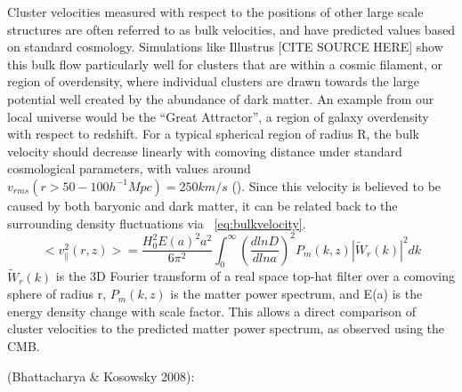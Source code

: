 \documentclass[manuscript]{aastex}
\begin{document}
Cluster velocities measured with respect to the positions of other large scale structures are often referred to as bulk velocities, and have predicted values based on standard cosmology.  Simulations like Illustrus [CITE SOURCE HERE] show this bulk flow particularly well for clusters that are within a cosmic filament, or region of overdensity, where individual clusters are drawn towards the large potential well created by the abundance of dark matter. An example from our local universe would be the ``Great Attractor'', a region of galaxy overdensity with respect to redshift. For a typical spherical region of radius R, the bulk velocity should decrease linearly with comoving distance under standard cosmological parameters, with values around \(v_{rms}(r > 50-100  h^{-1} Mpc) = 250 km/s\) (\cite{Mak2011}). Since this velocity is believed to be caused by both baryonic and dark matter, it can be related back to the surrounding density fluctuations via ~\ref{eq:bulkvelocity}. 
\begin{equation}\label{eq:bulkvelocity}
 <v^{2}_{\parallel}(r,z)> = \frac{H_{0}^{2}E(a)^{2}a^{2}}{6\pi^{2}} \int_{0}^{\infty} (\frac{d ln D}{d ln a})^{2} P_{m}(k,z)|\tilde{W}_{r}(k)|^{2} dk
 \end{equation}
\(\tilde{W}_{r}(k)\) is the 3D Fourier transform of a real space top-hat filter over a comoving sphere of radius r, \(P_{m}(k,z)\) is the matter power spectrum, and E(a) is the energy density change with scale factor. This allows a direct comparison of cluster velocities to the predicted matter power spectrum, as observed using the CMB.


(Bhattacharya & Kosowsky 2008):


\end{document}
